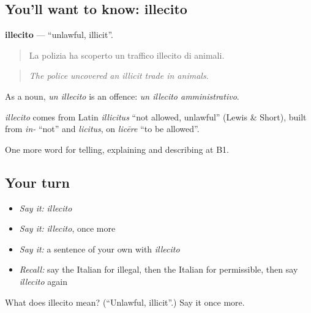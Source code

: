\subsection*{You'll want to know: illecito}
\textbf{illecito} — \textquotedblleft{}unlawful, illicit\textquotedblright{}.

\begin{quote}
La polizia ha scoperto un traffico illecito di animali.
\end{quote}

\begin{quote}
\emph{The police uncovered an illicit trade in animals.}
\end{quote}

As a noun, \emph{un illecito} is an offence: \emph{un illecito amministrativo}.

\begin{cousinweb}
\emph{illecito} comes from Latin \emph{illicitus} \textquotedblleft{}not allowed, unlawful\textquotedblright{} (Lewis \& Short), built from \emph{in-} \textquotedblleft{}not\textquotedblright{} and \emph{licitus}, on \emph{licēre} \textquotedblleft{}to be allowed\textquotedblright{}.
\end{cousinweb}

\begin{grammarlens}[title={What you've built}]
One more word for telling, explaining and describing at B1.
\end{grammarlens}

\subsection*{Your turn}
\begin{itemize}
\raggedright
  \item \emph{Say it:} \emph{illecito}
  \item \emph{Say it:} \emph{illecito}, once more
  \item \emph{Say it:} a sentence of your own with \emph{illecito}
  \item \emph{Recall:} say the Italian for illegal, then the Italian for permissible, then say \emph{illecito} again
\end{itemize}

\begin{tcolorbox}[breakable,colback=teal!4,colframe=teal!35!black,title={Before you move on}]
What does illecito mean? (\textquotedblleft{}Unlawful, illicit\textquotedblright{}.) Say it once more.
\end{tcolorbox}
